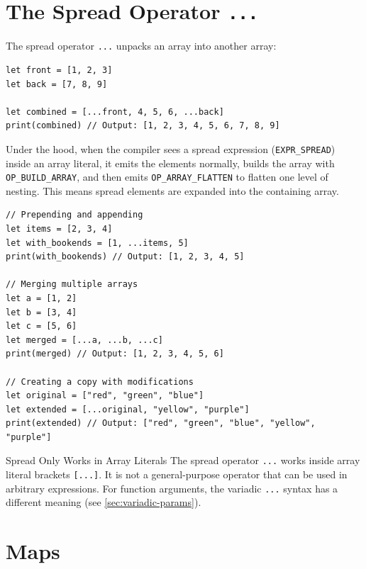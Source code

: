 \section{The Spread Operator \texttt{...}}\label{sec:spread-operator}

The spread operator \lstinline|...| unpacks an array into another array:

\begin{lstlisting}[language=Lattice, caption={Spread operator basics}]
let front = [1, 2, 3]
let back = [7, 8, 9]

let combined = [...front, 4, 5, 6, ...back]
print(combined) // Output: [1, 2, 3, 4, 5, 6, 7, 8, 9]
\end{lstlisting}

Under the hood, when the compiler sees a spread expression (\lstinline|EXPR_SPREAD|) inside an array literal, it emits the elements normally, builds the array with \lstinline|OP_BUILD_ARRAY|, and then emits \lstinline|OP_ARRAY_FLATTEN| to flatten one level of nesting. This means spread elements are expanded into the containing array.

\begin{lstlisting}[language=Lattice, caption={Common spread patterns}]
// Prepending and appending
let items = [2, 3, 4]
let with_bookends = [1, ...items, 5]
print(with_bookends) // Output: [1, 2, 3, 4, 5]

// Merging multiple arrays
let a = [1, 2]
let b = [3, 4]
let c = [5, 6]
let merged = [...a, ...b, ...c]
print(merged) // Output: [1, 2, 3, 4, 5, 6]

// Creating a copy with modifications
let original = ["red", "green", "blue"]
let extended = [...original, "yellow", "purple"]
print(extended) // Output: ["red", "green", "blue", "yellow", "purple"]
\end{lstlisting}

\begin{warnbox}{Spread Only Works in Array Literals}
The spread operator \lstinline|...| works inside array literal brackets \lstinline|[...]|. It is not a general-purpose operator that can be used in arbitrary expressions. For function arguments, the variadic \lstinline|...| syntax has a different meaning (see \cref{sec:variadic-params}).
\end{warnbox}

\section{Maps}\label{sec:maps}

